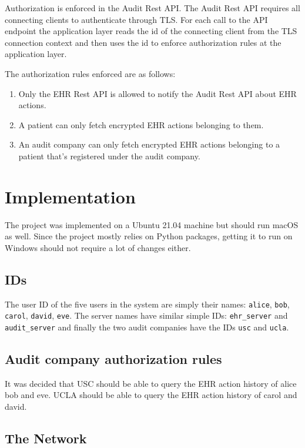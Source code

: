\documentclass[11pt]{article}
\begin{document}
\begin{flushleft}
Authorization is enforced in the Audit Rest API. The Audit Rest API requires all connecting clients to authenticate through TLS. For each call to the API endpoint the application layer reads the id of the connecting client from the TLS connection context and then uses the id to enforce authorization rules at the application layer.

The authorization rules enforced are as follows:

\begin{enumerate}
	\item Only the EHR Rest API is allowed to notify the Audit Rest API about EHR actions.
	\item A patient can only fetch encrypted EHR actions belonging to them.
	\item An audit company can only fetch encrypted EHR actions belonging to a patient that's registered under the audit company.
\end{enumerate}


\section{Implementation}

The project was implemented on a Ubuntu 21.04 machine but should run macOS as well. Since the project mostly relies on Python packages, getting it to run on Windows should not require a lot of changes either.

\subsection{IDs}

The user ID of the five users in the system are simply their names: \verb+alice+, \verb+bob+, \verb+carol+, \verb+david+, \verb+eve+. The server names have similar simple IDs: \verb+ehr_server+ and \verb+audit_server+ and finally the two audit companies have the IDs \verb+usc+ and \verb+ucla+.

\subsection{Audit company authorization rules}

It was decided that USC should be able to query the EHR action history of alice bob and eve. UCLA should be able to query the EHR action history of carol and david.

\subsection{The Network}


\end{flushleft}
\end{document}
